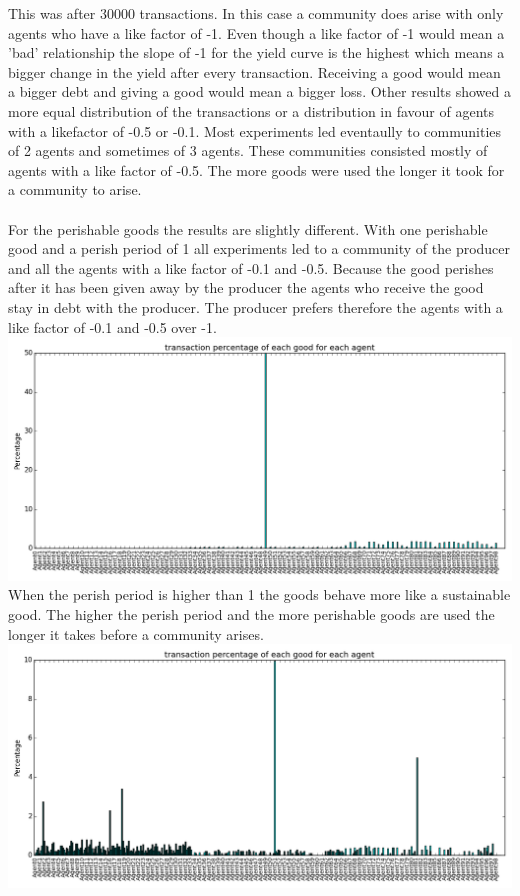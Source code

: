 \documentclass[twoside,openright]{uva-bachelor-thesis}
\begin{document}
This was after 30000 transactions. In this case a community does arise with only agents who have a like factor of -1. Even though a like factor of -1 would mean a 'bad' relationship the slope of -1 for the yield curve is the highest which means a bigger change in the yield after every transaction. Receiving a good would mean a bigger debt and giving a good would mean a bigger loss.
Other results showed a more equal distribution of the transactions or a distribution in favour of agents with a likefactor of -0.5 or -0.1. Most experiments led eventaully to communities of 2 agents and sometimes of 3 agents. These communities consisted mostly of agents with a like factor of -0.5. The more goods were used the longer it took for a community to arise. \\
\\
For the perishable goods the results are slightly different. With one perishable good and a perish period of 1 all experiments led to a community of the producer and all the agents with a like factor of -0.1 and -0.5. Because the good perishes after it has been given away by the producer the agents who receive the good stay in debt with the producer. The producer prefers therefore the agents with a like factor of -0.1 and -0.5 over -1. \\
\includegraphics[scale=0.4]{GR_L1B2N1/1000transactions1perishable1-1} \\
When the perish period is higher than 1 the goods behave more like a sustainable good. The higher the perish period and the more perishable goods are used the longer it takes before a community arises.\\
\includegraphics[scale=0.4]{GR_L1B2N1/1000transactions5perishable} \\
\end{document}
